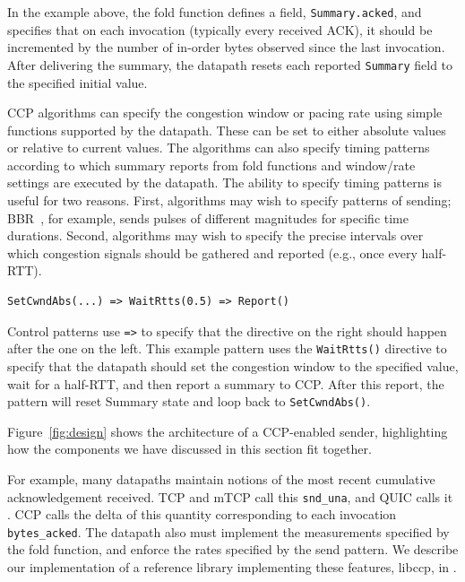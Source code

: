 In the example above, the fold function defines a field, \texttt{Summary.acked}, and specifies that on each invocation (typically every received ACK), it should be incremented by the number of in-order bytes observed since the last invocation. After delivering the summary, the datapath resets each reported \texttt{Summary} field to the specified initial value.


 CCP algorithms can specify the congestion window or pacing rate using simple functions supported by the datapath. These can be set to either absolute values or relative to current values. The algorithms can also specify timing patterns according to which summary reports from fold functions and window/rate settings are executed by the datapath. 
The ability to specify timing patterns is useful for two reasons. First, algorithms may wish to specify patterns of sending; BBR~\cite{bbr}, for example, sends pulses of different magnitudes for specific time durations. Second, algorithms may wish to specify the precise intervals over which congestion signals should be gathered and reported (e.g., once every half-RTT).

\begin{verbatim}
SetCwndAbs(...) => WaitRtts(0.5) => Report()
\end{verbatim}

Control patterns use \texttt{=>} to specify that the directive on the right should happen after the one on the left. This example pattern uses the \texttt{WaitRtts()} directive to specify that the datapath should set the congestion window to the specified value, wait for a half-RTT, and then report a summary to CCP. After this report, the pattern will reset Summary state and loop back to \texttt{SetCwndAbs()}.


Figure~\ref{fig:design} shows the architecture of a CCP-enabled sender, highlighting how the components we have discussed in this section fit together. 


    \2 For example, many datapaths maintain notions of the most recent cumulative acknowledgement received.
        \3 TCP and mTCP call this \texttt{snd\_una}, and QUIC calls it .
        \3 CCP calls the delta of this quantity corresponding to each invocation \texttt{bytes\_acked}.
    \2 The datapath also must implement the measurements specified by the fold function, and enforce the rates specified by the send pattern.
        \3 We describe our implementation of a reference library implementing these features, libccp, in .
        
